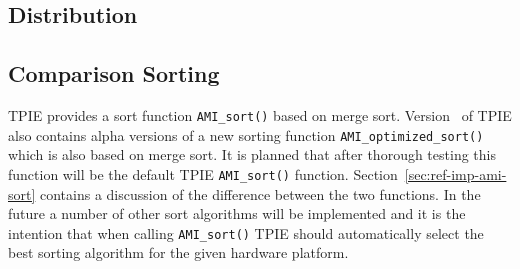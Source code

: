 

\subsection{Distribution}
\label{sec:ref-ami-dist}

\tobewritten


\subsection{Comparison Sorting}
\label{sec:ref-ami-sort}


TPIE provides a sort function \verb|AMI_sort()| based on merge
sort. Version \version~of TPIE also contains alpha versions of a new
sorting function \verb|AMI_optimized_sort()| which is also based on merge
sort. It is planned that after thorough testing this function will be the
default TPIE \verb|AMI_sort()| function. Section~\ref{sec:ref-imp-ami-sort}
contains a discussion of the difference between the two functions. In the
future a number of other sort algorithms will be implemented and it is the
intention that when calling \verb|AMI_sort()| TPIE should automatically
select the best sorting algorithm for the given hardware platform.

